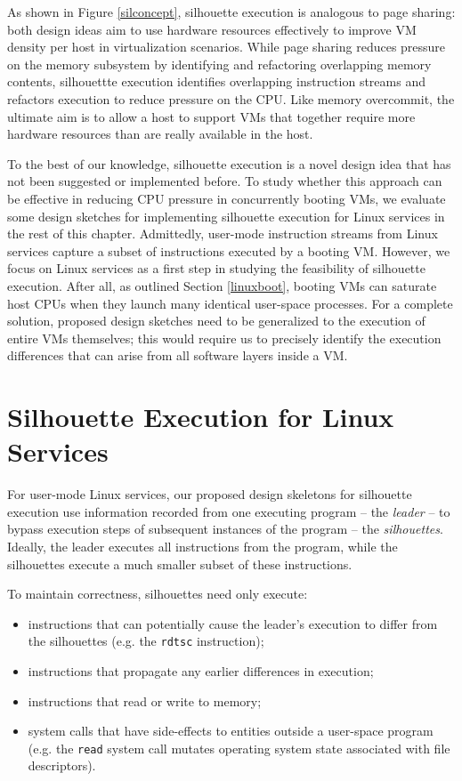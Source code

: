 As shown in Figure \ref{silconcept},
silhouette execution is analogous
to page sharing:
both design ideas aim to use hardware
resources effectively to improve VM density per host
in virtualization scenarios.
While page sharing reduces
pressure on the memory subsystem
by identifying and refactoring
overlapping memory contents,
silhouettte execution identifies
overlapping instruction streams
and refactors execution to
reduce pressure on the CPU.
Like memory overcommit,
the ultimate aim is to allow a host 
to support VMs that together require
more hardware resources than are really available
in the host.

To the best of our knowledge, silhouette execution is a novel
design idea that has not been
suggested or implemented before.
To study whether this approach
can be effective in reducing CPU pressure
in concurrently booting VMs,
we evaluate some design sketches for implementing silhouette
execution for Linux services in the rest of this chapter. Admittedly,
user-mode instruction streams 
from Linux services capture
a subset of instructions
executed by a booting VM.
However, we focus on 
Linux services as a first step in
studying the feasibility of 
silhouette execution.
After all, as outlined
Section \ref{linuxboot}, booting VMs
can saturate host CPUs when they launch many
identical user-space processes.
For a complete solution, proposed design sketches need to be 
generalized to the execution of entire
VMs themselves; this would require us to precisely
identify the execution differences that can
arise from all software layers inside a VM. \newline

\section{Silhouette Execution for Linux Services} \label{subsil}
For user-mode Linux services, our
proposed design skeletons for silhouette execution
use  information recorded from one
executing program -- the {\em leader} -- to
bypass execution steps of subsequent instances
of the program  -- the {\em silhouettes}. 
Ideally, the leader executes all instructions from the program, 
while the silhouettes execute a much smaller subset
of these instructions.  

\newpage
To maintain correctness,
silhouettes need only execute: 

\begin{itemize}
\item instructions that can potentially cause the leader's
  execution to differ from the silhouettes (e.g. the \texttt{rdtsc}
  instruction); 
\item instructions that propagate any earlier differences in execution; 
\item instructions that read or write to memory;
\item system calls that have side-effects to entities
  outside a user-space program
  (e.g. the \texttt{read} system call mutates operating system 
  state associated with file descriptors).
\end{itemize}

